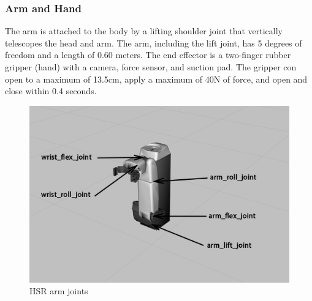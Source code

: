 \documentclass[12pt]{article}
\begin{document}
        \subsubsection{Arm and Hand}
            The arm is attached to the body by a lifting shoulder joint that vertically telescopes the head and arm. The arm, including the lift joint, has 5 degrees of freedom and a length of 0.60 meters. The end effector is a two-finger rubber gripper (hand) with a camera, force sensor, and suction pad. The gripper con open to a maximum of 13.5cm, apply a maximum of 40N of force, and open and close within 0.4 seconds.
            \begin{figure}[ht][ht]
                \includegraphics[width=\linewidth]{2020.05.07/Arm_labeled.png}
                \centering
                \caption{HSR arm joints}
                \label{fig:armLabels}
            \end{figure}
\end{document}
